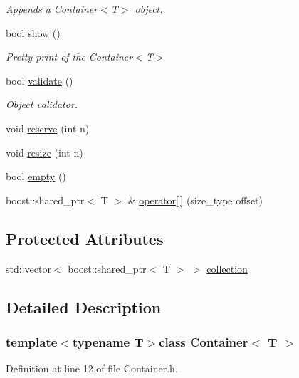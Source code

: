 \begin{DoxyCompactItemize}
\begin{DoxyCompactList}\small\item\em Appends a Container$<$T$>$ object. \end{DoxyCompactList}\item 
bool \hyperlink{class_container_ad72379ee222b073a5eecec7fc1bedfc2}{show} ()
\begin{DoxyCompactList}\small\item\em Pretty print of the Container$<$T$>$ \end{DoxyCompactList}\item 
bool \hyperlink{class_container_aa99a036fd0fe6d6b82ba558157e557d3}{validate} ()
\begin{DoxyCompactList}\small\item\em Object validator. \end{DoxyCompactList}\item 
void \hyperlink{class_container_aa3cbae68ebeed649c52eb3805a30fb75}{reserve} (int n)
\item 
void \hyperlink{class_container_ab77ce6f8173bd47c4cf46643317dffdb}{resize} (int n)
\item 
bool \hyperlink{class_container_ab8e09c25f519687468ef5b9f0fae9b3e}{empty} ()
\item 
boost::shared\_\-ptr$<$ T $>$ \& \hyperlink{class_container_aed3c227120a6a745fa9adfb25c3dd225}{operator\mbox{[}$\,$\mbox{]}} (size\_\-type offset)
\end{DoxyCompactItemize}
\subsection*{Protected Attributes}
\begin{DoxyCompactItemize}
\item 
std::vector$<$ boost::shared\_\-ptr$<$ T $>$ $>$ \hyperlink{class_container_a6cc12233bceb7d72709320d2c57e3398}{collection}
\end{DoxyCompactItemize}


\subsection{Detailed Description}
\subsubsection*{template$<$typename T$>$class Container$<$ T $>$}



Definition at line 12 of file Container.h.



